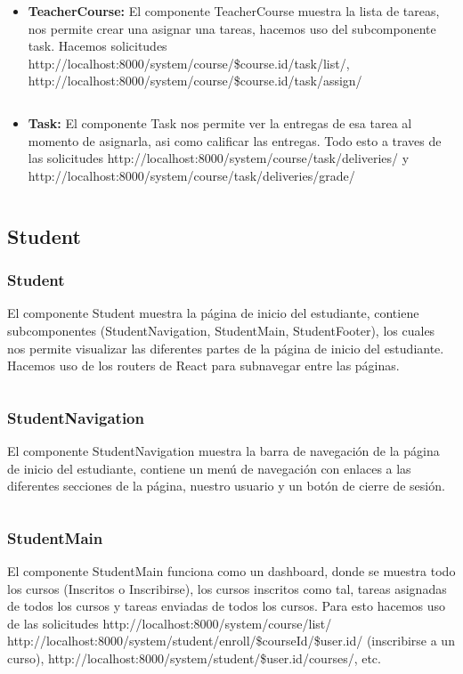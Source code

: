 \documentclass{article}
\begin{document}
\begin{itemize}
	\item \textbf{TeacherCourse:} El componente TeacherCourse muestra la lista de tareas, nos permite crear una asignar una tareas, hacemos uso del subcomponente task. Hacemos solicitudes http://localhost:8000/system/course/\${course.id}/task/list/, http://localhost:8000/system/course/\${course.id}/task/assign/\newline
	      \inputminted{javascript}{../fronted/src/designUI/Teacher/TeacherCourse.jsx}
	\item \textbf{Task:} El componente Task nos permite ver la entregas de esa tarea al momento de asignarla, asi como calificar las entregas. Todo esto a traves de las solicitudes http://localhost:8000/system/course/task/deliveries/ y http://localhost:8000/system/course/task/deliveries/grade/\newline
	      \inputminted{javascript}{../fronted/src/designUI/Teacher/Task.jsx}
\end{itemize}

\subsection{Student}
\subsubsection{Student}
El componente Student muestra la página de inicio del estudiante, contiene subcomponentes (StudentNavigation, StudentMain, StudentFooter), los cuales nos permite visualizar las diferentes partes de la página de inicio del estudiante. Hacemos uso de los routers de React para subnavegar entre las páginas.
\inputminted{javascript}{../fronted/src/designUI/Student/Student.jsx}
\subsubsection{StudentNavigation}
El componente StudentNavigation muestra la barra de navegación de la página de inicio del estudiante, contiene un menú de navegación con enlaces a las diferentes secciones de la página, nuestro usuario y un botón de cierre de sesión.
\inputminted{javascript}{../fronted/src/designUI/Student/StudentNavigation.jsx}
\subsubsection{StudentMain}
El componente StudentMain funciona como un dashboard, donde se muestra todo los cursos (Inscritos o Inscribirse), los cursos inscritos como tal, tareas asignadas de todos los cursos y tareas enviadas de todos los cursos. Para esto hacemos uso de las solicitudes http://localhost:8000/system/course/list/ http://localhost:8000/system/student/enroll/\${courseId}/\${user.id}/ (inscribirse a un curso), http://localhost:8000/system/student/\${user.id}/courses/, etc.
\inputminted{javascript}{../fronted/src/designUI/Student/StudentMain.jsx}
\end{document}
